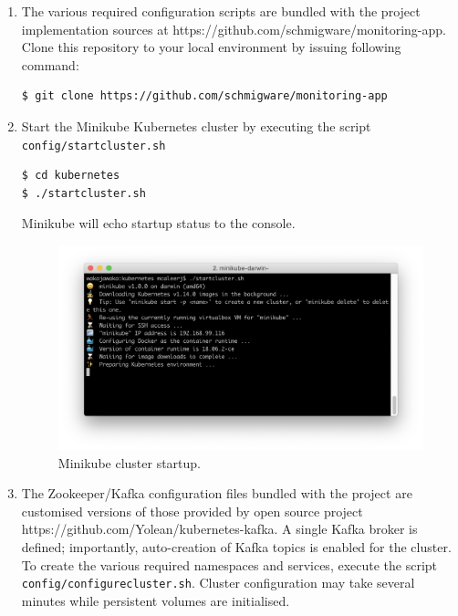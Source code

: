 \begin{enumerate}
	
 \item The various required configuration scripts are bundled with the project implementation sources at https://github.com/schmigware/monitoring-app. Clone this repository to your local environment by issuing following command: 

\begin{lstlisting}[language=bash]
$ git clone https://github.com/schmigware/monitoring-app
\end{lstlisting}

 \item Start the Minikube Kubernetes cluster by executing the script \texttt{config/startcluster.sh}

\begin{lstlisting}[language=bash]
$ cd kubernetes
$ ./startcluster.sh
\end{lstlisting}

Minikube will echo startup status to the console.

\begin{figure}[H]
	\centering  
	\includegraphics[width=\linewidth]{figures/appendixA/minikube-startup.png}
	\caption{Minikube cluster startup.}
\end{figure}


 \item The Zookeeper/Kafka configuration files bundled with the project are customised versions of those provided by open source project https://github.com/Yolean/kubernetes-kafka. A single Kafka broker is defined; importantly, auto-creation of Kafka topics is enabled for the cluster. To create the various required namespaces and services, execute the script \texttt{config/configurecluster.sh}. Cluster configuration may take several minutes while persistent volumes are initialised.


\end{enumerate}
